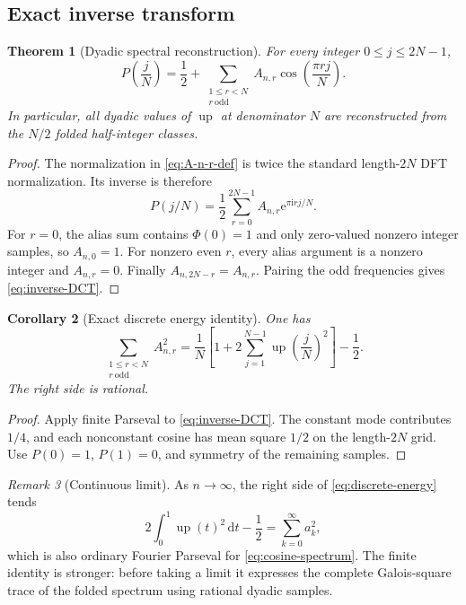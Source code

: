 \documentclass[11pt,oneside]{article}
\newtheorem{theorem}{Theorem}[section]
\newtheorem{corollary}[theorem]{Corollary}
\theoremstyle{definition}
\theoremstyle{remark}
\newtheorem{remark}[theorem]{Remark}
\newcommand{\Up}{\operatorname{up}}
\newcommand{\e}{\mathrm e}
\newcommand{\ii}{\mathrm i}
\newcommand{\dd}{\,\mathrm d}
\newcommand{\PhiU}{\Phi}
\begin{document}
\subsection{Exact inverse transform}

\begin{theorem}[Dyadic spectral reconstruction]\label{thm:inverse-DCT}
For every integer $0\le j\le2N-1$,
\begin{equation}\label{eq:inverse-DCT}
 \boxed{
 P\!\left(\frac jN\right)
 =\frac12+
 \sum_{\substack{1\le r<N\\r\ \mathrm{odd}}}
 A_{n,r}\cos\!\left(\frac{\pi rj}{N}\right).}
\end{equation}
In particular, all dyadic values of $\Up$ at denominator $N$ are reconstructed
from the $N/2$ folded half-integer classes.
\end{theorem}

\begin{proof}
The normalization in \eqref{eq:A-n-r-def} is twice the standard length-$2N$
DFT normalization.  Its inverse is therefore
\[
 P(j/N)=\frac12\sum_{r=0}^{2N-1}A_{n,r}\e^{\pi\ii rj/N}.
\]
For $r=0$, the alias sum contains $\PhiU(0)=1$ and only zero-valued nonzero
integer samples, so $A_{n,0}=1$.  For nonzero even $r$, every alias argument is
a nonzero integer and $A_{n,r}=0$.  Finally
$A_{n,2N-r}=A_{n,r}$.  Pairing the odd frequencies gives
\eqref{eq:inverse-DCT}.
\end{proof}

\begin{corollary}[Exact discrete energy identity]\label{cor:discrete-energy}
One has
\begin{equation}\label{eq:discrete-energy}
 \boxed{
 \sum_{\substack{1\le r<N\\r\ \mathrm{odd}}}A_{n,r}^2
 =\frac1N\left[1+2\sum_{j=1}^{N-1}
 \Up\!\left(\frac jN\right)^2\right]-\frac12.}
\end{equation}
The right side is rational.
\end{corollary}

\begin{proof}
Apply finite Parseval to \eqref{eq:inverse-DCT}.  The constant mode contributes
$1/4$, and each nonconstant cosine has mean square $1/2$ on the length-$2N$
grid.  Use $P(0)=1$, $P(1)=0$, and symmetry of the remaining samples.
\end{proof}

\begin{remark}[Continuous limit]
As $n\to\infty$, the right side of \eqref{eq:discrete-energy} tends
\[
 2\int_0^1\Up(t)^2\dd t-\frac12
 =\sum_{k=0}^{\infty}a_k^2,
\]
which is also ordinary Fourier Parseval for \eqref{eq:cosine-spectrum}.  The
finite identity is stronger: before taking a limit it expresses the complete
Galois-square trace of the folded spectrum using rational dyadic samples.
\end{remark}
\end{document}

